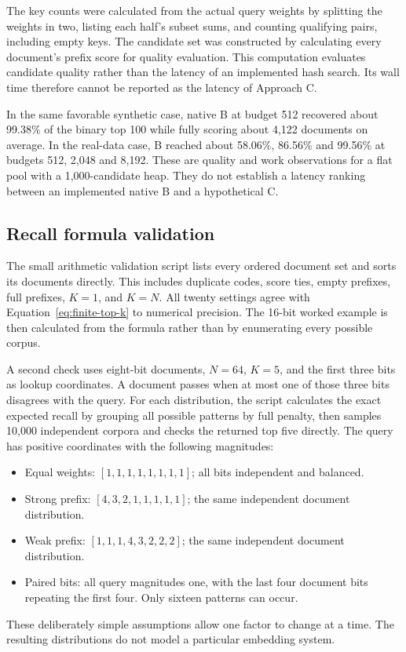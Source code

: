 The key counts were calculated from the actual query weights by splitting the weights in two, listing each half's subset sums, and counting qualifying pairs,
including empty keys. The candidate set was constructed by calculating every document's prefix score for quality evaluation. This computation evaluates candidate quality rather than the latency of an implemented
hash search. Its wall time therefore cannot be reported as the latency of Approach C.

In the same favorable synthetic case, native B at budget 512 recovered about 99.38\% of the
binary top 100 while fully scoring about 4,122 documents on average. In the real-data case,
B reached about 58.06\%, 86.56\% and 99.56\% at budgets 512, 2,048 and 8,192. These are quality
and work observations for a flat pool with a 1,000-candidate heap. They do not establish a
latency ranking between an implemented native B and a hypothetical C.

\subsection{Recall formula validation}
\label{sec:recall-checks}
The small arithmetic validation script lists every ordered document set and sorts its documents directly.
This includes duplicate codes, score ties, empty prefixes, full prefixes, $K=1$, and $K=N$.
All twenty settings agree with Equation~\eqref{eq:finite-top-k} to numerical precision. The
16-bit worked example is then calculated from the formula rather than by enumerating every
possible corpus.

A second check uses eight-bit documents, $N=64$, $K=5$, and the first three bits as lookup
coordinates. A document passes when at most one of those three bits disagrees with the query.
For each distribution, the script calculates the exact expected recall by grouping all possible
patterns by full penalty, then samples 10,000 independent corpora and checks the returned top
five directly. The query has positive coordinates with the following magnitudes:
\begin{itemize}
\item Equal weights: $[1,1,1,1,1,1,1,1]$; all bits independent and balanced.
\item Strong prefix: $[4,3,2,1,1,1,1,1]$; the same independent document distribution.
\item Weak prefix: $[1,1,1,4,3,2,2,2]$; the same independent document distribution.
\item Paired bits: all query magnitudes one, with the last four document bits repeating the
first four. Only sixteen patterns can occur.
\end{itemize}
These deliberately simple assumptions allow one factor to change at a time. The resulting
distributions do not model a particular embedding system.

